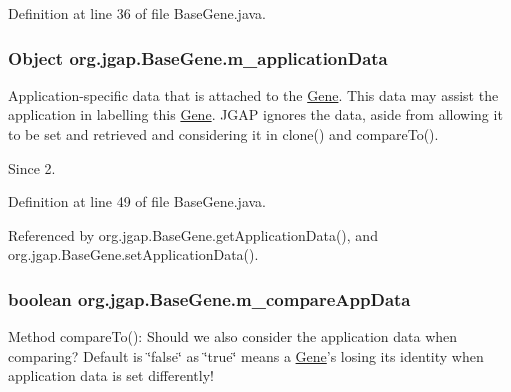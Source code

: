 Definition at line 36 of file Base\-Gene.\-java.

\hypertarget{classorg_1_1jgap_1_1_base_gene_ab2e121e812be7a4dead5ca7e300ac3d7}{
\subsubsection[{m\-\_\-application\-Data}]{\setlength{\rightskip}{0pt plus 5cm}Object org.\-jgap.\-Base\-Gene.\-m\-\_\-application\-Data\hspace{0.3cm}{\ttfamily [private]}}}\label{classorg_1_1jgap_1_1_base_gene_ab2e121e812be7a4dead5ca7e300ac3d7}
Application-\/specific data that is attached to the \hyperlink{interfaceorg_1_1jgap_1_1_gene}{Gene}. This data may assist the application in labelling this \hyperlink{interfaceorg_1_1jgap_1_1_gene}{Gene}. J\-G\-A\-P ignores the data, aside from allowing it to be set and retrieved and considering it in clone() and compare\-To().

\begin{DoxySince}{Since}
2. 
\end{DoxySince}


Definition at line 49 of file Base\-Gene.\-java.



Referenced by org.\-jgap.\-Base\-Gene.\-get\-Application\-Data(), and org.\-jgap.\-Base\-Gene.\-set\-Application\-Data().

\hypertarget{classorg_1_1jgap_1_1_base_gene_a27bb3cd52e8cd52fffc4953f172709a2}{
\subsubsection[{m\-\_\-compare\-App\-Data}]{\setlength{\rightskip}{0pt plus 5cm}boolean org.\-jgap.\-Base\-Gene.\-m\-\_\-compare\-App\-Data\hspace{0.3cm}{\ttfamily [private]}}}\label{classorg_1_1jgap_1_1_base_gene_a27bb3cd52e8cd52fffc4953f172709a2}
Method compare\-To()\-: Should we also consider the application data when comparing? Default is \char`\"{}false\char`\"{} as \char`\"{}true\char`\"{} means a \hyperlink{interfaceorg_1_1jgap_1_1_gene}{Gene}'s losing its identity when application data is set differently!


